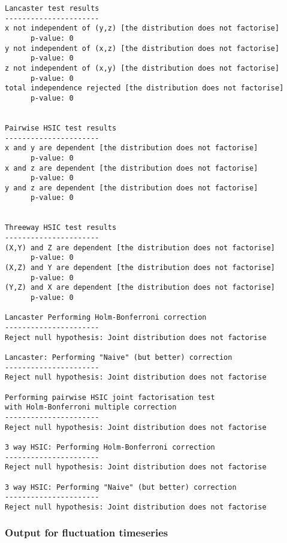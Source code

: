 \documentclass[12pt]{article}
\numberwithin{claim}{section}
\numberwithin{lemma}{section}
\numberwithin{theorem}{section}
\begin{document}
\begin{verbatim}
Lancaster test results
----------------------
x not independent of (y,z) [the distribution does not factorise]
      p-value: 0
y not independent of (x,z) [the distribution does not factorise]
      p-value: 0
z not independent of (x,y) [the distribution does not factorise]
      p-value: 0
total independence rejected [the distribution does not factorise]
      p-value: 0


Pairwise HSIC test results
----------------------
x and y are dependent [the distribution does not factorise]
      p-value: 0
x and z are dependent [the distribution does not factorise]
      p-value: 0
y and z are dependent [the distribution does not factorise]
      p-value: 0


Threeway HSIC test results
----------------------
(X,Y) and Z are dependent [the distribution does not factorise]
      p-value: 0
(X,Z) and Y are dependent [the distribution does not factorise]
      p-value: 0
(Y,Z) and X are dependent [the distribution does not factorise]
      p-value: 0

Lancaster Performing Holm-Bonferroni correction
----------------------
Reject null hypothesis: Joint distribution does not factorise

Lancaster: Performing "Naive" (but better) correction
----------------------
Reject null hypothesis: Joint distribution does not factorise

Performing pairwise HSIC joint factorisation test 
with Holm-Bonferroni multiple correction
----------------------
Reject null hypothesis: Joint distribution does not factorise

3 way HSIC: Performing Holm-Bonferroni correction
----------------------
Reject null hypothesis: Joint distribution does not factorise

3 way HSIC: Performing "Naive" (but better) correction
----------------------
Reject null hypothesis: Joint distribution does not factorise

\end{verbatim}


\subsubsection{Output for fluctuation timeseries}
\end{document}
